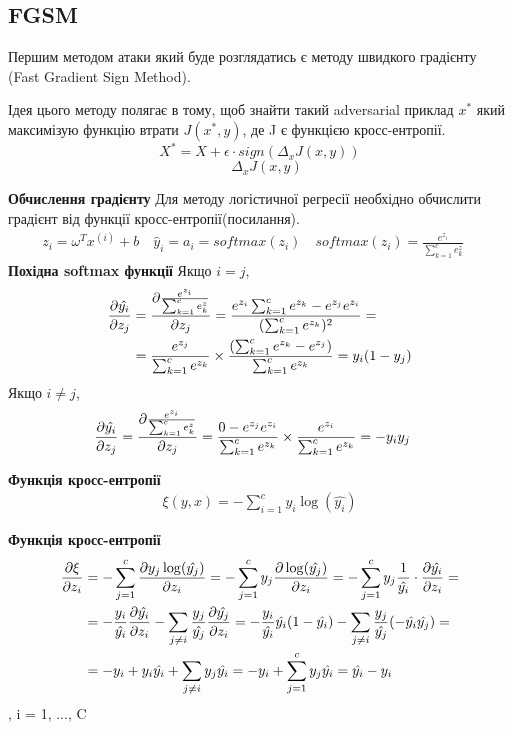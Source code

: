 \documentclass[a4paper,14pt]{extreport}
\newcommand{\tran}{^{T}}
\newcommand{\ith}{^{(i)}}
\begin{document}
	\subsection{FGSM}
	Першим методом атаки який буде розглядатись є методу швидкого градієнту (Fast Gradient Sign Method).
	
	Ідея цього методу полягає в тому, щоб знайти такий adversarial приклад $x^{*}$ який максимізую функцію втрати $J(x^{*}, y)$, де J є функцією кросс-ентропії.
	$$ X^{*} = X + \epsilon \cdot sign(\Delta_x J(x, y))$$
	$$\quad \Delta_x J(x, y)$$	
	
	\textbf{Обчислення градієнту}
	\newline
	Для методу логістичної регресії необхідно обчислити градієнт від функції кросс-ентропії(посилання).
	\begin{align*}
		z_i = \omega\tran x\ith + b \quad
		\hat{y}_i = a_i = softmax(z_i) \quad
		softmax(z_i) = \frac{e^{z_i}}{\sum_{k=1}^{c} e_k^z} \quad
	\end{align*}
	\textbf{Похідна softmax функції} \newline
	Якщо $i = j$,
	\begin{align*}
	    \pdv{\hat{y_i}}{z_j} 
	    &=
	    \pdv{\frac{e^{z_i}}{\sum_{k=1}^{c} e_k^z}}{z_j} 
	    =
	    \frac{e^{z_i} \sum_{k=1}^{c} e^{z_k} - e^{z_j} e^{z_i}}{(\sum_{k=1}^{c}  e^{z_k})^2} 
	    = \\& =
	    \frac{e^{z_j}}{\sum_{k=1}^{c}  e^{z_k}} \times \frac{(\sum_{k=1}^{c} e^{z_k} - e^{z_j})}{\sum_{k=1}^{c}  e^{z_k}} 
	    = 
	    y_i(1-y_j)
	\end{align*}
	Якщо $i \neq j$,
	\begin{align*}
		\pdv{\hat{y_i}}{z_j}
		&=
		\pdv{\frac{e^{z_i}}{\sum_{k=1}^{c} e_k^z}}{z_j} 
		=
		\frac{0 - e^{z_j} e^{z_i}}{\sum_{k=1}^{c}  e^{z_k}} \times \frac{e^{z_i}}{\sum_{k=1}^{c} e^{z_k}} 
		= 
		-y_i y_j 
	\end{align*}
	
	\textbf{Функція кросс-ентропії}
	\begin{align*}
		\xi(y, x) = - \sum_{i=1}^{c} y_i  \log (\hat{y_i})
	\end{align*}
	
	\textbf{Функція кросс-ентропії}
	\begin{align*}
		\pdv{\xi}{z_i} 
		&= 
		- \sum_{j=1}^{c} \pdv{ y_j \log (\hat{y_j})}{z_i} 
		=
		- \sum_{j=1}^{c} y_j \pdv{ \log (\hat{y_j})}{z_i} 
		= 
		- \sum_{j=1}^{c} y_j \frac{1}{\hat{y_i}} \cdot \pdv{\hat{y_i}}{z_i} 
		= \\& =
		- \frac{y_i}{\hat{y_i}} \pdv{\hat{y_i}}{z_i} - \sum_{j \neq i} \frac{y_j}{\hat{y_j}} \pdv{\hat{y_j}}{z_i} 
		= 
		-\frac{y_i}{\hat{y_i}} \hat{y_i} (1 - \hat{y_i}) - \sum_{j \neq i} \frac{y_j}{\hat{y_j}} (-\hat{y_i} \hat{y_j}) 
		= \\& =
		-y_i + y_i \hat{y_i} + \sum_{j \neq i} y_j \hat{y_i}
		= 
		-y_i + \sum_{j=1}^{c} y_j \hat{y_i} 
		=
		\hat{y_i} - y_i
	\end{align*}
	, i = 1, ..., C
	
\end{document}
